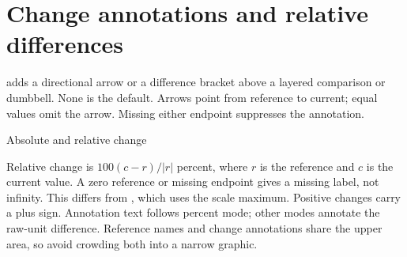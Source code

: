 \section{Change annotations and relative differences}
 adds a directional arrow or a
difference bracket above a layered comparison or dumbbell. None is the default.
Arrows point from reference to current; equal values omit the arrow. Missing
either endpoint suppresses the annotation.
\begin{demo}{Absolute and relative change}


\end{demo}
Relative change is $100(c-r)/|r|$ percent, where $r$ is the reference and $c$
is the current value. A zero reference or missing endpoint gives a missing label,
not infinity. This differs from , which uses the scale
maximum. Positive changes carry a plus sign. Annotation text follows percent
mode; other modes annotate the raw-unit difference. Reference names and change
annotations share the upper area, so avoid crowding both into a narrow graphic.
